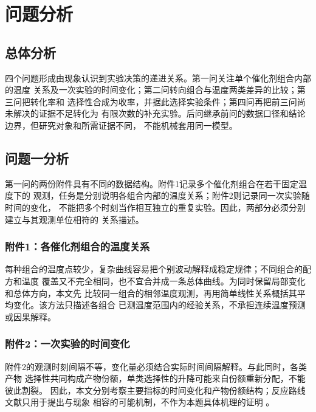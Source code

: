 \section{问题分析}\label{sec:analysis}

\subsection{总体分析}

四个问题形成由现象认识到实验决策的递进关系。第一问关注单个催化剂组合内部的温度
关系及一次实验的时间变化；第二问转向组合与温度两类差异的比较；第三问把转化率和
选择性合成为收率，并据此选择实验条件；第四问再把前三问尚未解决的证据不足转化为
有限次数的补充实验。后问继承前问的数据口径和结论边界，但研究对象和所需证据不同，
不能机械套用同一模型。

\subsection{问题一分析}

第一问的两份附件具有不同的数据结构。附件1记录多个催化剂组合在若干固定温度下的
观测，任务是分别说明各组合内部的温度关系；附件2则记录同一次实验随时间的变化，
不能把多个时刻当作相互独立的重复实验。因此，两部分必须分别建立与其观测单位相符的
关系描述。

\subsubsection{附件1：各催化剂组合的温度关系}

每种组合的温度点较少，复杂曲线容易把个别波动解释成稳定规律；不同组合的配方和温度
覆盖又不完全相同，也不宜合并成一条总体曲线。为同时保留局部变化和总体方向，本文先
比较同一组合的相邻温度观测，再用简单线性关系概括其平均变化。该方法只描述各组合
已测温度范围内的经验关系，不承担连续温度预测或因果解释。

\subsubsection{附件2：一次实验的时间变化}

附件2的观测时刻间隔不等，变化量必须结合实际时间间隔解释。与此同时，各类产物
选择性共同构成产物份额，单类选择性的升降可能来自份额重新分配，不能彼此割裂。
因此，本文分别考察主要指标的时间变化和产物份额结构；反应路线文献只用于提出与现象
相容的可能机制，不作为本题具体机理的证明
\cite{aitchison1982,ho2016,moteki2016,sushkevich2017}。




